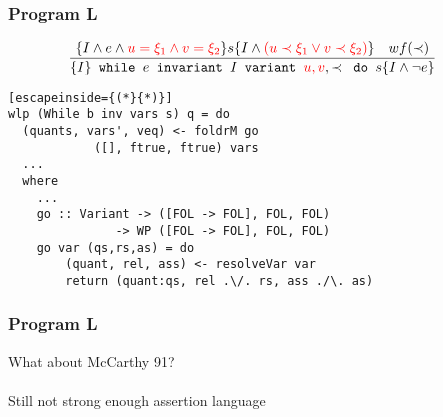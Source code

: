 \begin{frame}[containsverbatim]
  \frametitle{Program L}
\begin{align*}
  &\frac{
    \{I \land e \land \textcolor{red}{u = \xi_{1} \land v = \xi_{2}} \} s \{I \land \textcolor{red}{(u \prec \xi_{1} \lor v \prec \xi_{2})} \} \quad wf(\prec)
  }{
    \{I\} \texttt{ while } e \texttt{ invariant } I
          \texttt{ variant } \textcolor{red}{u,v} , \prec \texttt{ do } s \{I \land \neg e\}
  }
\end{align*}
\begin{lstlisting}[escapeinside={(*}{*)}]
wlp (While b inv vars s) q = do
  (quants, vars', veq) <- foldrM go
            ([], ftrue, ftrue) vars
  ...
  where
    ...
    go :: Variant -> ([FOL -> FOL], FOL, FOL)
               -> WP ([FOL -> FOL], FOL, FOL)
    go var (qs,rs,as) = do
        (quant, rel, ass) <- resolveVar var
        return (quant:qs, rel .\/. rs, ass ./\. as)
\end{lstlisting}
\end{frame}
\begin{frame}[containsverbatim]
  \frametitle{Program L}
  What about McCarthy 91?
  \\~\\
  Still not strong enough assertion language
\end{frame}
